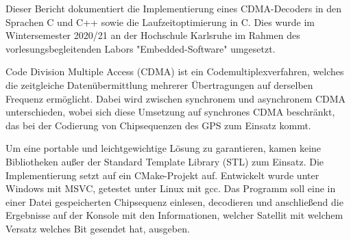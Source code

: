 Dieser Bericht dokumentiert die Implementierung eines CDMA-Decoders in den Sprachen C und C++ sowie die Laufzeitoptimierung in C. Dies wurde im Wintersemester 2020/21 an der Hochschule Karlsruhe im Rahmen des vorlesungsbegleitenden Labors "Embedded-Software" umgesetzt. 

Code Division Multiple Access (CDMA) ist ein Codemultiplexverfahren, welches die zeitgleiche Datenübermittlung mehrerer Übertragungen auf derselben Frequenz ermöglicht. Dabei wird zwischen synchronem und asynchronem CDMA unterschieden, wobei sich diese Umsetzung auf synchrones CDMA beschränkt, das bei der Codierung von Chipsequenzen des GPS zum Einsatz kommt.

Um eine portable und leichtgewichtige Lösung zu garantieren, kamen keine Bibliotheken außer der Standard Template Library (STL) zum Einsatz. Die Implementierung setzt auf ein CMake-Projekt auf. Entwickelt wurde unter Windows mit MSVC, getestet unter Linux mit gcc.
Das Programm soll eine in einer Datei gespeicherten Chipsequenz einlesen, decodieren und anschließend die Ergebnisse auf der Konsole mit den Informationen, welcher Satellit mit welchem Versatz welches Bit gesendet hat, ausgeben. 